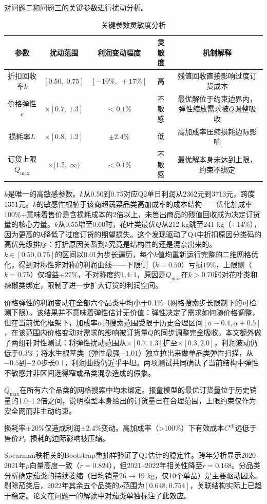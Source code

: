 对问题二和问题三的关键参数进行扰动分析。

\begin{table}[H]
  \centering
  \caption{关键参数灵敏度分析}
  \label{tab:sensitivity}
  \begin{tabularx}{\textwidth}{CCCCC}
    \toprule
    参数 & 扰动范围 & 利润变动幅度 & 灵敏度 & 机制解释 \\
    \midrule
    折扣回收率$k$ & $[0.50,\;0.75]$ & $[-19\%,\;+17\%]$ & 高 & 残值回收直接影响过度订货成本 \\
    价格弹性$e$ & $\times[0.7,\;1.3]$ & $<0.1\%$ & 不敏感 & 最优解位于约束边界内，弹性缩放需求被$Q$调整吸收 \\
    损耗率$L$ & $\times[0.8,\;1.2]$ & $\pm 2.4\%$ & 低 & 高加成率压缩损耗边际影响 \\
    订货上限$Q_{\max}$ & $\times[1.2,\;\infty)$ & $<0.1\%$ & 不敏感 & 最优解本身未达到上限，约束不绑定 \\
    \bottomrule
  \end{tabularx}
\end{table}

$k$是唯一的高敏感参数。$k$从0.50到0.75对应Q2单日利润从2362元到3713元，跨度1351元。$k$的敏感性根植于该商超蔬菜品类高加成率的成本结构——优化加成率100\%+意味着售价是含损耗成本的2倍以上，未售出商品的残值回收成为决定订货量的核心力量。$k$从0.55增至0.60时，花叶类最优$Q$从212 kg跳至241 kg（+14\%），因为更高的$k$降低了过度订货的期望损失。这个发现驱动了Q4中折扣原因分类码的高优先级排序：打折原因关系到$k$究竟是结构性的还是混杂出来的。$k\in[0.50,0.75]$的区间以0.01为步长遍历，每个$k$值均重新运行完整的二维网格优化，得到对称性非对称的利润曲线——下限侧（$k=0.50$）亏损$19\%$，上限侧（$k=0.75$）仅增益$+27\%$，不对称度约$1.4:1$，原因是$Q_{\max}$在$k>0.70$时对花叶类和辣椒类绑定，限制了进一步扩大订货的利润空间。

价格弹性的利润变动在全部六个品类中均小于0.1\%（网格搜索步长限制下的可检测下限）。该结果并不意味着弹性估计无价值：弹性决定了需求如何随价格调整，但在当前优化框架下，加成率$\alpha$的搜索范围受限于历史合理区间$[\bar{\alpha}-0.4, \bar{\alpha}+0.5]$，在该范围内价格变动对需求的影响被订货量$Q$的同步调整完全吸收。本文额外做了两组针对性测试：将弹性扰动范围从$\times[0.7,1.3]$扩至$\times[0.3,2.0]$，利润波动仍低于0.3\%；将水生根茎类（弹性最强$-1.01$）独立拉出来做单品类弹性扫描，从$-0.5$到$-2.0$步长0.1，利润曲线仍近乎平坦。两项测试共同确认了当前结构中弹性不敏感并非区间选得窄或品类混杂造成的假象。

$Q_{\max}$在所有六个品类的网格搜索中均未绑定。报童模型的最优订货量位于历史销量的1.0--1.2倍之间，说明模型本身给出的订货量已在合理范围，上限约束仅作为安全网而非主动约束。

损耗率$\pm 20\%$仅造成利润$\pm 2.4\%$变动。高加成率（>100\%）下有效成本$C^{\text{eff}}$远低于售价$P$，损耗的边际影响被压缩。

Spearman秩相关的Bootstrap重抽样验证了Q1估计的稳定性。跨年分析显示2020--2021年$\rho$向量高度一致（$r=0.824$），但2021--2022年相关性降至$r=0.168$。分品类分析确定茄类的持续萎缩（日均销量26$\to$19 kg，仅10个单品）是主要驱动因素。剔除茄类后，2022年其余五个品类的$\rho$范围为$[0.648,0.754]$，关联结构实际上已趋于稳定。论文在问题一的解读中对茄类单独标注了此效应。
